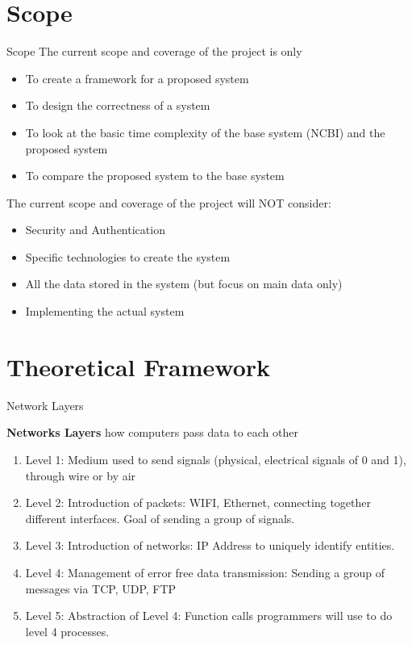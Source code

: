 \documentclass{beamer}
\begin{document}
\section{Scope}
\begin{frame}{Scope}
The current scope and coverage of the project is only
\begin{itemize}
    \item To create a framework for a proposed system
    \item To design the correctness of a system
    \item To look at the basic time complexity of the base system (NCBI) and the proposed system
    \item To compare the proposed system to the base system
\end{itemize}

The current scope and coverage of the project will NOT consider:
\begin{itemize}
    \item Security and Authentication 
    \item Specific technologies to create the system
    \item All the data stored in the system (but focus on main data only)
    \item Implementing the actual system 
\end{itemize}

\end{frame}


\section{Theoretical Framework}

        \begin{frame}{Network Layers}

         \textbf{Networks Layers} how computers pass data to each other
        \begin{enumerate}
                    \item Level 1: Medium used to send signals (physical, electrical signals of 0 and 1), through wire or by air
                    \item Level 2: Introduction of packets: WIFI, Ethernet, connecting together different interfaces. Goal of sending a group of signals.
                    \item Level 3: Introduction of networks: IP Address to uniquely identify entities.
                    \item Level 4: Management of error free data transmission: Sending a group of messages via TCP, UDP, FTP
                    \item Level 5: Abstraction of Level 4: Function calls programmers will use to do level 4 processes.
        \end{enumerate}
        \end{frame}
    
\end{document}
